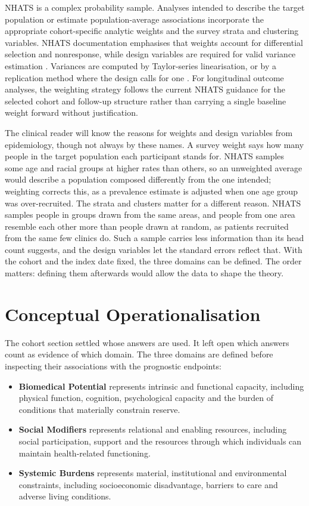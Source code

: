 NHATS is a complex probability sample. Analyses intended to describe the target population or estimate population-average associations incorporate the appropriate cohort-specific analytic weights and the survey strata and clustering variables. NHATS documentation emphasises that weights account for differential selection and nonresponse, while design variables are required for valid variance estimation \citep{nhats_cohort_2019,nhats_methods_2026}. Variances are computed by Taylor-series linearisation, or by a replication method where the design calls for one \citep{binder_1983,wolter_2007,lumley_2010}. For longitudinal outcome analyses, the weighting strategy follows the current NHATS guidance for the selected cohort and follow-up structure rather than carrying a single baseline weight forward without justification.

The clinical reader will know the reasons for weights and design variables from epidemiology, though not always by these names. A survey weight says how many people in the target population each participant stands for. NHATS samples some age and racial groups at higher rates than others, so an unweighted average would describe a population composed differently from the one intended; weighting corrects this, as a prevalence estimate is adjusted when one age group was over-recruited. The strata and clusters matter for a different reason. NHATS samples people in groups drawn from the same areas, and people from one area resemble each other more than people drawn at random, as patients recruited from the same few clinics do. Such a sample carries less information than its head count suggests, and the design variables let the standard errors reflect that.
With the cohort and the index date fixed, the three domains can be defined. The order matters: defining them afterwards would allow the data to shape the theory.

\section{Conceptual Operationalisation}
\label{sec:operationalisation}

The cohort section settled whose answers are used. It left open which answers count as evidence of which domain. The three domains are defined before inspecting their associations with the prognostic endpoints:

\begin{itemize}
    \item \textbf{Biomedical Potential} represents intrinsic and functional capacity, including physical function, cognition, psychological capacity and the burden of conditions that materially constrain reserve.
    \item \textbf{Social Modifiers} represents relational and enabling resources, including social participation, support and the resources through which individuals can maintain health-related functioning.
    \item \textbf{Systemic Burdens} represents material, institutional and environmental constraints, including socioeconomic disadvantage, barriers to care and adverse living conditions.
\end{itemize}


